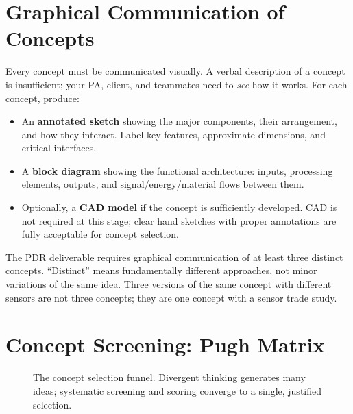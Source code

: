 \section{Graphical Communication of Concepts}
Every concept must be communicated visually. A verbal description of a concept is insufficient; your PA, client, and teammates need to \emph{see} how it works. For each concept, produce:

\begin{itemize}[nosep,leftmargin=1.5em]
\item An \textbf{annotated sketch} showing the major components, their arrangement, and how they interact. Label key features, approximate dimensions, and critical interfaces.
\item A \textbf{block diagram} showing the functional architecture: inputs, processing elements, outputs, and signal/energy/material flows between them.
\item Optionally, a \textbf{CAD model} if the concept is sufficiently developed. CAD is not required at this stage; clear hand sketches with proper annotations are fully acceptable for concept selection.
\end{itemize}

The PDR deliverable requires graphical communication of at least three distinct concepts. ``Distinct'' means fundamentally different approaches, not minor variations of the same idea. Three versions of the same concept with different sensors are not three concepts; they are one concept with a sensor trade study.

\section{Concept Screening: Pugh Matrix}

\begin{figure}[htbp]
\centering
{}
\caption{The concept selection funnel. Divergent thinking generates many ideas; systematic screening and scoring converge to a single, justified selection.}\label{fig:concept-funnel}
\end{figure}

